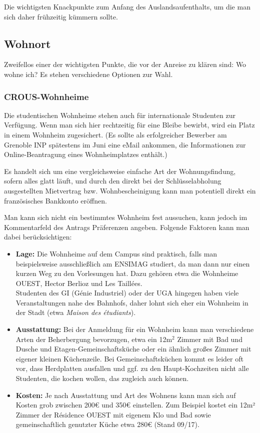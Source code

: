 \documentclass[11pt,a4paper]{article}
\begin{document}
	Die wichtigsten Knackpunkte zum Anfang des Auslandsaufenthalts, um die man sich daher frühzeitig kümmern sollte.
	
	\subsection{Wohnort}
	
	Zweifellos einer der wichtigsten Punkte, die vor der Anreise zu klären sind: Wo wohne ich? Es stehen verschiedene Optionen zur Wahl.
	
	\subsubsection{CROUS-Wohnheime}
	
	Die studentischen Wohnheime stehen auch für internationale Studenten zur Verfügung. Wenn man sich hier rechtzeitig für eine Bleibe bewirbt, wird ein Platz in einem Wohnheim zugesichert. (Es sollte als erfolgreicher Bewerber am Grenoble INP spätestens im Juni eine eMail ankommen, die Informationen zur Online-Beantragung eines Wohnheimplatzes enthält.)
	
	Es handelt sich um eine vergleichsweise einfache Art der Wohnungsfindung, sofern alles glatt läuft, und durch den direkt bei der Schlüsselabholung ausgestellten Mietvertrag bzw. Wohnbescheinigung kann man potentiell direkt ein französisches Bankkonto eröffnen.
	
	Man kann sich nicht ein bestimmtes Wohnheim fest aussuchen, kann jedoch im Kommentarfeld des Antrags Präferenzen angeben. Folgende Faktoren kann man dabei berücksichtigen:
	
	\begin{itemize}
		\item \textbf{Lage:} Die Wohnheime auf dem Campus sind praktisch, falls man beispielsweise ausschließlich am ENSIMAG studiert, da man dann nur einen kurzen Weg zu den Vorlesungen hat. Dazu gehören etwa die Wohnheime OUEST, Hector Berlioz und Les Taillées. \\
		Studenten des GI (Génie Industriel) oder der UGA hingegen haben viele Veranstaltungen nahe des Bahnhofs, daher lohnt sich eher ein Wohnheim in der Stadt (etwa \emph{Maison des étudiants}).
		\item \textbf{Ausstattung:} Bei der Anmeldung für ein Wohnheim kann man verschiedene Arten der Beherbergung bevorzugen, etwa ein 12m$^2$ Zimmer mit Bad und Dusche und Etagen-Gemeinschaftsküche oder ein ähnlich großes Zimmer mit eigener kleinen Küchenzeile. Bei Gemeinschaftsküchen kommt es leider oft vor, dass Herdplatten ausfallen und ggf. zu den Haupt-Kochzeiten nicht alle Studenten, die kochen wollen, das zugleich auch können.
		\item \textbf{Kosten:} Je nach Ausstattung und Art des Wohnens kann man sich auf Kosten grob zwischen 200€ und 350€ einstellen. Zum Beispiel kostet ein 12m² Zimmer der Résidence OUEST mit eigenem Klo und Bad sowie gemeinschaftlich genutzter Küche etwa 280€ (Stand 09/17).
	\end{itemize}
\end{document}
